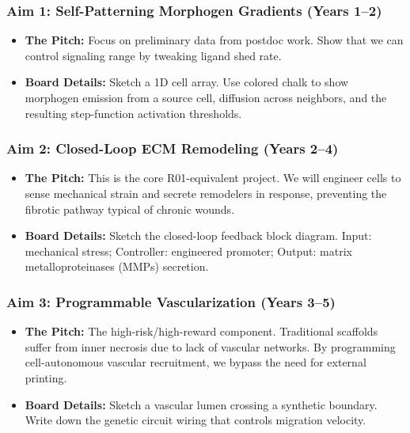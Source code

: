 \subsubsection{Aim 1: Self-Patterning Morphogen Gradients (Years 1--2)}
\begin{itemize}
    \item \textbf{The Pitch:} Focus on preliminary data from postdoc work. Show that we can control signaling range by tweaking ligand shed rate.
    \item \textbf{Board Details:} Sketch a 1D cell array. Use colored chalk to show morphogen emission from a source cell, diffusion across neighbors, and the resulting step-function activation thresholds.
\end{itemize}

\subsubsection{Aim 2: Closed-Loop ECM Remodeling (Years 2--4)}
\begin{itemize}
    \item \textbf{The Pitch:} This is the core R01-equivalent project. We will engineer cells to sense mechanical strain and secrete remodelers in response, preventing the fibrotic pathway typical of chronic wounds.
    \item \textbf{Board Details:} Sketch the closed-loop feedback block diagram. Input: mechanical stress; Controller: engineered promoter; Output: matrix metalloproteinases (MMPs) secretion.
\end{itemize}

\subsubsection{Aim 3: Programmable Vascularization (Years 3--5)}
\begin{itemize}
    \item \textbf{The Pitch:} The high-risk/high-reward component. Traditional scaffolds suffer from inner necrosis due to lack of vascular networks. By programming cell-autonomous vascular recruitment, we bypass the need for external printing.
    \item \textbf{Board Details:} Sketch a vascular lumen crossing a synthetic boundary. Write down the genetic circuit wiring that controls migration velocity.
\end{itemize}
